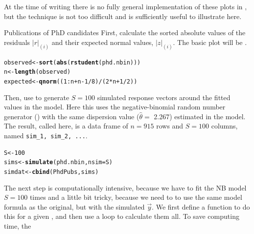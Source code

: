 \documentclass[11pt]{book}\usepackage[]{graphicx}\usepackage[]{color}
\makeatletter
\newcommand{\hlnum}[1]{\textcolor[rgb]{0.686,0.059,0.569}{#1}}%
\newcommand{\hlopt}[1]{\textcolor[rgb]{0,0,0}{#1}}%
\newcommand{\hlstd}[1]{\textcolor[rgb]{0.345,0.345,0.345}{#1}}%
\newcommand{\hlkwb}[1]{\textcolor[rgb]{0.69,0.353,0.396}{#1}}%
\newcommand{\hlkwc}[1]{\textcolor[rgb]{0.333,0.667,0.333}{#1}}%
\newcommand{\hlkwd}[1]{\textcolor[rgb]{0.737,0.353,0.396}{\textbf{#1}}}%
\newenvironment{kframe}{%
 \def\at@end@of@kframe{}%
 \ifinner\ifhmode%
  \def\at@end@of@kframe{\end{minipage}}%
  \begin{minipage}{\columnwidth}%
 \fi\fi%
 \def\FrameCommand##1{\hskip\@totalleftmargin \hskip-\fboxsep
 \colorbox{shadecolor}{##1}\hskip-\fboxsep
     \hskip-\linewidth \hskip-\@totalleftmargin \hskip\columnwidth}%
 \MakeFramed {\advance\hsize-\width
   \@totalleftmargin\z@ \linewidth\hsize
   \@setminipage}}%
 {\par\unskip\endMakeFramed%
 \at@end@of@kframe}
\newenvironment{knitrout}{}{} %
\renewenvironment{knitrout}{\small\renewcommand{\baselinestretch}{.85}}{} %
\makeatother
\begin{document}
At the time of writing there is no fully general implementation of these plots in \R,
but the technique is not too difficult and is sufficiently useful to illustrate here.

\begin{Example}[phdpubs6]{Publications of PhD candidates}
First, calculate the sorted absolute values of the residuals $|r|_{(i)}$ and
their expected normal values, $|z|_{(i)}$.  The basic plot will be
.
\begin{knitrout}
\color{fgcolor}\begin{kframe}
\begin{alltt}
\hlstd{observed} \hlkwb{<-} \hlkwd{sort}\hlstd{(}\hlkwd{abs}\hlstd{(}\hlkwd{rstudent}\hlstd{(phd.nbin)))}
\hlstd{n} \hlkwb{<-} \hlkwd{length}\hlstd{(observed)}
\hlstd{expected} \hlkwb{<-} \hlkwd{qnorm}\hlstd{((}\hlnum{1}\hlopt{:}\hlstd{n} \hlopt{+} \hlstd{n} \hlopt{-} \hlnum{1}\hlopt{/}\hlnum{8}\hlstd{)}\hlopt{/}\hlstd{(}\hlnum{2}\hlopt{*}\hlstd{n} \hlopt{+} \hlnum{1}\hlopt{/}\hlnum{2}\hlstd{))}
\end{alltt}
\end{kframe}
\end{knitrout}
Then, use  to generate $S=100$ simulated response vectors around the fitted
values in the model. Here this uses the negative-binomial random number generator ()
with the same dispersion value ($\widehat{\theta} =$ 2.267) 
estimated in the model.  The result, called  here, is a data frame of
$n=915$ rows and $S=100$ columns, named \verb|sim_1, sim_2, ...|.
\begin{knitrout}
\color{fgcolor}\begin{kframe}
\begin{alltt}
\hlstd{S} \hlkwb{<-} \hlnum{100}
\hlstd{sims} \hlkwb{<-} \hlkwd{simulate}\hlstd{(phd.nbin,} \hlkwc{nsim}\hlstd{=S)}
\hlstd{simdat} \hlkwb{<-} \hlkwd{cbind}\hlstd{(PhdPubs, sims)}
\end{alltt}
\end{kframe}
\end{knitrout}
The next step is computationally intensive, because we have to fit the NB model $S=100$ times
and a little bit tricky, because we need to to use the same model formula as the original,
but with the simulated $\vec{y}$.  
We first define a function  to do this for a given ,
and then use a loop to calculate them all. To save computing time, the

\end{Example}
\end{document}
